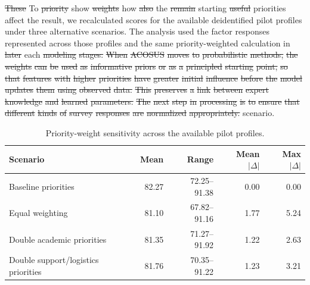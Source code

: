 \documentclass[letterpaper,11pt]{article}
\newcommand{\DIFdel}[1]{%
  \begingroup\setlength{\fboxsep}{0.5pt}%
  \colorbox{diffdelbg}{\textcolor{diffdeltext}{\sout{#1}}}%
  \endgroup}
\newcommand{\DIFadd}[1]{%
  \begingroup\setlength{\fboxsep}{0.5pt}%
  \colorbox{diffaddbg}{\textcolor{diffaddtext}{#1}}%
  \endgroup}
\begin{document}
\DIFdel{These} \DIFadd{To} \DIFdel{priority} \DIFadd{show} \DIFdel{weights} \DIFadd{how} \DIFdel{also} \DIFadd{the} \DIFdel{remain} \DIFadd{starting} \DIFdel{useful} \DIFadd{priorities} \DIFadd{affect} \DIFadd{the} \DIFadd{result,} \DIFadd{we} \DIFadd{recalculated} \DIFadd{scores} \DIFadd{for} \DIFadd{the} \DIFadd{available} \DIFadd{deidentified} \DIFadd{pilot} \DIFadd{profiles} \DIFadd{under} \DIFadd{three} \DIFadd{alternative} \DIFadd{scenarios.} \DIFadd{The} \DIFadd{analysis} \DIFadd{used} \DIFadd{the} \DIFadd{factor} \DIFadd{responses} \DIFadd{represented} \DIFadd{across} \DIFadd{those} \DIFadd{profiles} \DIFadd{and} \DIFadd{the} \DIFadd{same} \DIFadd{priority-weighted} \DIFadd{calculation} in \DIFdel{later} \DIFadd{each} \DIFdel{modeling} \DIFdel{stages.} \DIFdel{When} \DIFdel{ACOSUS} \DIFdel{moves} \DIFdel{to} \DIFdel{probabilistic} \DIFdel{methods,} \DIFdel{the} \DIFdel{weights} \DIFdel{can} \DIFdel{be} \DIFdel{used} \DIFdel{as} \DIFdel{informative} \DIFdel{priors} \DIFdel{or} \DIFdel{as} \DIFdel{a} \DIFdel{principled} \DIFdel{starting} \DIFdel{point,} \DIFdel{so} \DIFdel{that} \DIFdel{features} \DIFdel{with} \DIFdel{higher} \DIFdel{priorities} \DIFdel{have} \DIFdel{greater} \DIFdel{initial} \DIFdel{influence} \DIFdel{before} \DIFdel{the} \DIFdel{model} \DIFdel{updates} \DIFdel{them} \DIFdel{using} \DIFdel{observed} \DIFdel{data.} \DIFdel{This} \DIFdel{preserves} \DIFdel{a} \DIFdel{link} \DIFdel{between} \DIFdel{expert} \DIFdel{knowledge} \DIFdel{and} \DIFdel{learned} \DIFdel{parameters.} \DIFdel{The} \DIFdel{next} \DIFdel{step} \DIFdel{in} \DIFdel{processing} \DIFdel{is} \DIFdel{to} \DIFdel{ensure} \DIFdel{that} \DIFdel{different} \DIFdel{kinds} \DIFdel{of} \DIFdel{survey} \DIFdel{responses} \DIFdel{are} \DIFdel{normalized} \DIFdel{appropriately.} \DIFadd{scenario.}

\begin{table}[htbp]
\caption{Priority-weight sensitivity across the available pilot profiles.}
\label{tab:sensitivity}
\centering
\begin{tabular}{@{}p{4.1cm}rrrr@{}}
\toprule
\textbf{Scenario} & \textbf{Mean} & \textbf{Range} & \textbf{Mean $|\Delta|$} & \textbf{Max $|\Delta|$} \\
\midrule
Baseline priorities & 82.27 & 72.25--91.38 & 0.00 & 0.00 \\
Equal weighting & 81.10 & 67.82--91.16 & 1.77 & 5.24 \\
Double academic priorities & 81.35 & 71.27--91.92 & 1.22 & 2.63 \\
Double support/logistics priorities & 81.76 & 70.35--91.22 & 1.23 & 3.21 \\
\bottomrule
\end{tabular}
\end{table}
\end{document}
